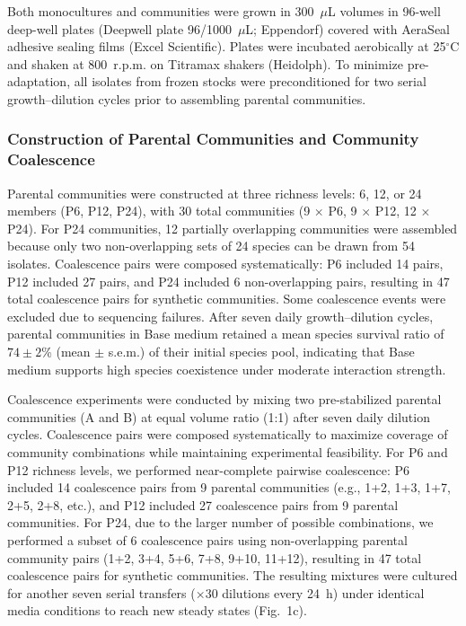 Both monocultures and communities were grown in 300~$\mu$L volumes in 96-well deep-well plates (Deepwell plate 96/1000~$\mu$L; Eppendorf) covered with AeraSeal adhesive sealing films (Excel Scientific). Plates were incubated aerobically at 25$^\circ$C and shaken at 800~r.p.m. on Titramax shakers (Heidolph). To minimize pre-adaptation, all isolates from frozen stocks were preconditioned for two serial growth--dilution cycles prior to assembling parental communities.


\subsubsection*{Construction of Parental Communities and Community Coalescence}
\label{sec:suppl:coalescence}

Parental communities were constructed at three richness levels: 6, 12, or 24 members (P6, P12, P24), with 30 total communities (9 $\times$ P6, 9 $\times$ P12, 12 $\times$ P24). For P24 communities, 12 partially overlapping communities were assembled because only two non-overlapping sets of 24 species can be drawn from 54 isolates. Coalescence pairs were composed systematically: P6 included 14 pairs, P12 included 27 pairs, and P24 included 6 non-overlapping pairs, resulting in 47 total coalescence pairs for synthetic communities. Some coalescence events were excluded due to sequencing failures. After seven daily growth--dilution cycles, parental communities in Base medium retained a mean species survival ratio of $74 \pm 2$\% (mean $\pm$ s.e.m.) of their initial species pool, indicating that Base medium supports high species coexistence under moderate interaction strength.

Coalescence experiments were conducted by mixing two pre-stabilized parental communities (A and B) at equal volume ratio (1:1) after seven daily dilution cycles. Coalescence pairs were composed systematically to maximize coverage of community combinations while maintaining experimental feasibility. For P6 and P12 richness levels, we performed near-complete pairwise coalescence: P6 included 14 coalescence pairs from 9 parental communities (e.g., 1+2, 1+3, 1+7, 2+5, 2+8, etc.), and P12 included 27 coalescence pairs from 9 parental communities. For P24, due to the larger number of possible combinations, we performed a subset of 6 coalescence pairs using non-overlapping parental community pairs (1+2, 3+4, 5+6, 7+8, 9+10, 11+12), resulting in 47 total coalescence pairs for synthetic communities. The resulting mixtures were cultured for another seven serial transfers ($\times$30 dilutions every 24~h) under identical media conditions to reach new steady states (Fig.~1c).


